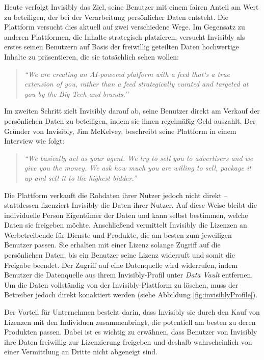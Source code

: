 \noindent Heute verfolgt Invisibly das Ziel, seine Benutzer mit einem fairen Anteil am Wert zu beteiligen, der bei der Verarbeitung persönlicher Daten entsteht. Die Plattform versucht dies aktuell auf zwei verschiedene Wege. Im Gegensatz zu anderen Plattformen, die Inhalte strategisch platzieren, versucht Invisibly als erstes seinen Benutzern auf Basis der freiwillig geteilten Daten hochwertige Inhalte zu präsentieren, die sie tatsächlich sehen wollen: \begin{quote}
    \textit{``We are creating an AI-powered platform with a feed that`s a true extension of you, rather than a feed strategically curated and targeted at you by the Big Tech and brands.'' \cite{invisiblyWhyPay_2021}}
\end{quote} Im zweiten Schritt zielt Invisibly darauf ab, seine Benutzer direkt am Verkauf der persönlichen Daten zu beteiligen, indem sie ihnen regelmäßig Geld auszahlt. \cite{invisiblyWhyPay_2021} Der Gründer von Invisibly, Jim McKelvey, beschreibt seine Plattform in einem Interview wie folgt: \begin{quote}
    \textit{``We basically act as your agent. We try to sell you to advertisers and we give you the money. We ask how much you are willing to sell, package it up and sell it to the highest bidder.'' \cite{techRadarInvisibly_2021}}
\end{quote} Die Plattform verkauft die Rohdaten ihrer Nutzer jedoch nicht direkt -- stattdessen lizenziert Invisibly die Daten ihrer Nutzer. Auf diese Weise bleibt die individuelle Person Eigentümer der Daten und kann selbst bestimmen, welche Daten sie freigeben möchte. \cite{invisiblyGetPaid_2021} Anschließend vermittelt Invisibly die Lizenzen an Werbetreibende für Dienste und Produkte, die am besten zum jeweiligen Benutzer passen. Sie erhalten mit einer Lizenz solange Zugriff auf die persönlichen Daten, bis ein Benutzer seine Lizenz widerruft und somit die Freigabe beendet. Der Zugriff auf eine Datenquelle wird widerrufen, indem Benutzer die Datenquelle aus ihrem Invisibly-Profil unter \textit{Data Vault} entfernen. Um die Daten vollständig von der Invisibly-Plattform zu löschen, muss der Betreiber jedoch direkt konaktiert werden (siehe Abbildung \ref{fig:invisiblyProfile}). \newline

\noindent Der Vorteil für Unternehmen besteht darin, dass Invisibly sie durch den Kauf von Lizenzen mit den Individuen zusammenbringt, die potentiell am besten zu deren Produkten passen. \cite{techRadarInvisibly_2021} Dabei ist es wichtig zu erwähnen, dass Benutzer von Invisibly ihre Daten freiwillig zur Lizenzierung freigeben und deshalb wahrscheinlich von einer Vermittlung an Dritte nicht abgeneigt sind. \newline

